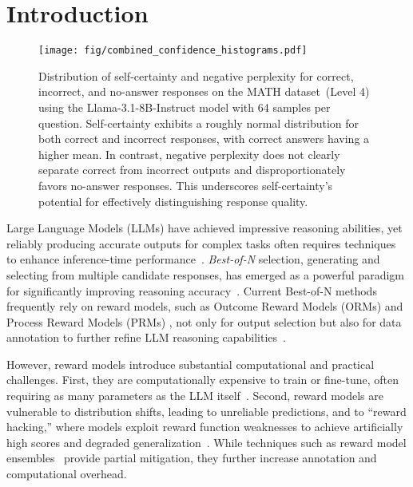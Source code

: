 \section{Introduction}


\begin{figure}[t]
    \centering
    \texttt{[image: fig/combined\_confidence\_histograms.pdf]}
    \vspace{-1.5em}
    \caption{Distribution of self-certainty and negative perplexity for correct, incorrect, and no-answer responses on the MATH dataset~(Level 4)~\citep{MATH} using the Llama-3.1-8B-Instruct model with 64 samples per question. Self-certainty exhibits a roughly normal distribution for both correct and incorrect responses, with correct answers having a higher mean. In contrast, negative perplexity does not clearly separate correct from incorrect outputs and disproportionately favors no-answer responses. This underscores self-certainty’s potential for effectively distinguishing response quality.} 
    \label{fig:freq}
\end{figure}

Large Language Models (LLMs) have achieved impressive reasoning abilities, yet reliably producing accurate outputs for complex tasks often requires techniques to enhance inference-time performance~\citep{wu2024inference, xiang2025towards}.  \emph{Best-of-N} selection, generating and selecting from multiple candidate responses, has emerged as a powerful paradigm for significantly improving reasoning accuracy~\citep{snell2024scaling}.  Current Best-of-N methods frequently rely on reward models, such as Outcome Reward Models (ORMs) \cite{cobbe2021training} and Process Reward Models (PRMs) \cite{lightman2023let,uesato2022solving,wang2022self}, not only for output selection but also for data annotation to further refine LLM reasoning capabilities~\citep{uesato2022solving,wang2022self}.

However, reward models introduce substantial computational and practical challenges. First, they are computationally expensive to train or fine-tune, often requiring as many parameters as the LLM itself~\citep{wang2024math}.  Second, reward models are vulnerable to distribution shifts, leading to unreliable predictions, and to ``reward hacking,'' where models exploit reward function weaknesses to achieve artificially high scores and degraded generalization~\citep{eisenstein2023helping}.  While techniques such as reward model ensembles~\citep{coste2023reward} provide partial mitigation, they further increase annotation and computational overhead.

